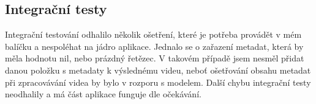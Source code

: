 \subsection{Integrační testy}
\par Integrační testování odhalilo několik ošetření, které je potřeba provádět v mém balíčku a nespoléhat na jádro aplikace. Jednalo se o zařazení metadat, která by měla hodnotu nil, nebo prázdný řetězec. V takovém případě jsem nesměl přidat danou položku s metadaty k výslednému videu, neboť ošetřování obsahu metadat při zpracovávání videa by bylo v rozporu s modelem. Další chybu integrační testy neodhalily a má část aplikace funguje dle očekávání.